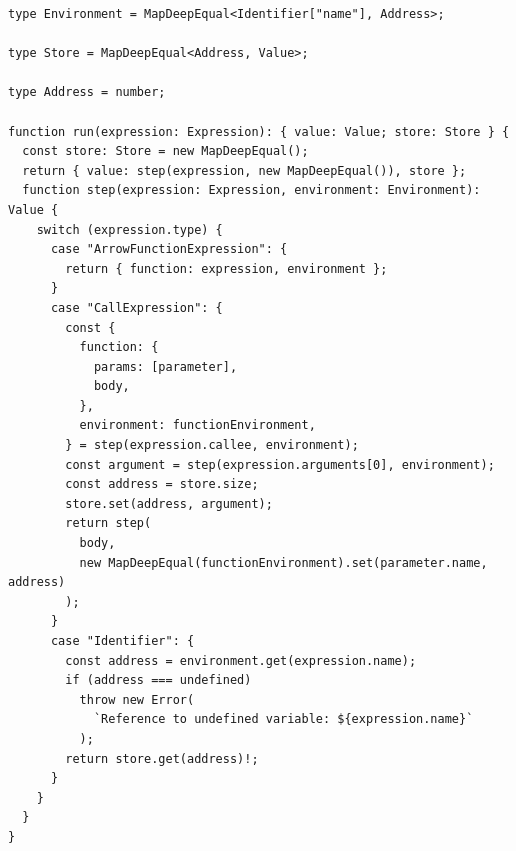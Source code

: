 \documentclass[12pt, oneside]{book}
\begin{document}
\begin{verbatim}
type Environment = MapDeepEqual<Identifier["name"], Address>;

type Store = MapDeepEqual<Address, Value>;

type Address = number;

function run(expression: Expression): { value: Value; store: Store } {
  const store: Store = new MapDeepEqual();
  return { value: step(expression, new MapDeepEqual()), store };
  function step(expression: Expression, environment: Environment): Value {
    switch (expression.type) {
      case "ArrowFunctionExpression": {
        return { function: expression, environment };
      }
      case "CallExpression": {
        const {
          function: {
            params: [parameter],
            body,
          },
          environment: functionEnvironment,
        } = step(expression.callee, environment);
        const argument = step(expression.arguments[0], environment);
        const address = store.size;
        store.set(address, argument);
        return step(
          body,
          new MapDeepEqual(functionEnvironment).set(parameter.name, address)
        );
      }
      case "Identifier": {
        const address = environment.get(expression.name);
        if (address === undefined)
          throw new Error(
            `Reference to undefined variable: ${expression.name}`
          );
        return store.get(address)!;
      }
    }
  }
}
\end{verbatim}
\end{document}
